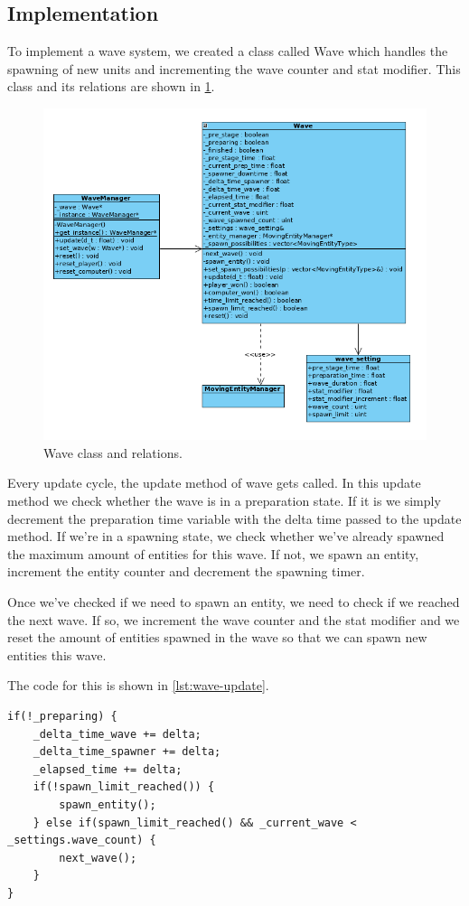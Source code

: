 \subsection{Implementation}
\label{sec:wave-implementation}

To implement a wave system, we created a class called Wave which handles the 
spawning of new units and incrementing the wave counter and stat modifier.
This class and its relations are shown in \cref{fig:wave}.

\begin{figure}[H]
    \centering
    \includegraphics[scale=0.6]{res/wave.png}
    \caption{Wave class and relations.}\label{fig:wave}
\end{figure}

Every update cycle, the update method of wave gets called. In this update 
method we check whether the wave is in a preparation state. If it is we 
simply decrement the preparation time variable with the delta time passed to 
the update method. If we're in a spawning state, we check whether we've 
already spawned the maximum amount of entities for this wave. If not, we spawn 
an entity, increment the entity counter and decrement the spawning timer.

Once we've checked if we need to spawn an entity, we need to check if we 
reached the next wave. If so, we increment the wave counter and the stat 
modifier and we reset the amount of entities spawned in the wave so that we 
can spawn new entities this wave.

The code for this is shown in \cref{lst:wave-update}.
\\
\begin{lstlisting}[caption={Spawning entities and next wave.},
label={lst:wave-update}]
if(!_preparing) {
    _delta_time_wave += delta;
    _delta_time_spawner += delta;
    _elapsed_time += delta;
    if(!spawn_limit_reached()) {
        spawn_entity();
    } else if(spawn_limit_reached() && _current_wave < _settings.wave_count) {
        next_wave();
    }
}
\end{lstlisting}
